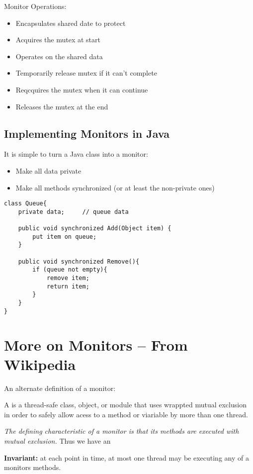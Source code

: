Monitor Operations:
\begin{itemize}
    \item Encapsulates shared date to protect
    \item Acquires the mutex at start
    \item Operates on the shared data
    \item Temporarily release mutex if it can't complete
    \item Reqcquires the mutex when it can continue
    \item Releases the mutex at the end
\end{itemize}

\subsection{Implementing Monitors in Java}

It is simple to turn a Java class into a monitor:

\begin{itemize}
    \item Make all data private
    \item Make all methods synchronized (or at least the non-private ones)
\end{itemize}

\begin{verbatim}
class Queue{
    private data;     // queue data

    public void synchronized Add(Object item) {
        put item on queue;
    }

    public void synchronized Remove(){
        if (queue not empty){
            remove item;
            return item;
        }
    }
}
\end{verbatim}


\section{More on Monitors -- From Wikipedia}
An alternate definition of a monitor:
\begin{dfn}
    A  is a thread-safe class, object, or module that uses
    wrappted mutual exclusion in order to safely allow acess to a method or
    viariable by more than one thread.
\end{dfn}

\emph{The defining characteristic of a monitor is that its methods are executed
with mutual exclusion.} Thus we have an

\textbf{Invariant:} at each point in time, at most one thread may be executing
any of a monitors methods.

